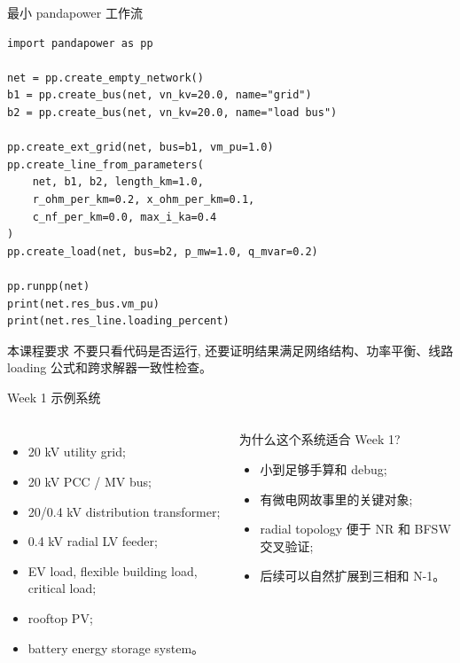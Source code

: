 \documentclass[aspectratio=169,10pt]{ctexbeamer}
\begin{document}
\begin{frame}[fragile]{最小 pandapower 工作流}
\begin{lstlisting}
import pandapower as pp

net = pp.create_empty_network()
b1 = pp.create_bus(net, vn_kv=20.0, name="grid")
b2 = pp.create_bus(net, vn_kv=20.0, name="load bus")

pp.create_ext_grid(net, bus=b1, vm_pu=1.0)
pp.create_line_from_parameters(
    net, b1, b2, length_km=1.0,
    r_ohm_per_km=0.2, x_ohm_per_km=0.1,
    c_nf_per_km=0.0, max_i_ka=0.4
)
pp.create_load(net, bus=b2, p_mw=1.0, q_mvar=0.2)

pp.runpp(net)
print(net.res_bus.vm_pu)
print(net.res_line.loading_percent)
\end{lstlisting}
\begin{alertblock}{本课程要求}
不要只看代码是否运行, 还要证明结果满足网络结构、功率平衡、线路 loading 公式和跨求解器一致性检查。
\end{alertblock}
\end{frame}

\begin{frame}{Week 1 示例系统}
\begin{columns}[T]
\begin{itemize}
  \item 20 kV utility grid;
  \item 20 kV PCC / MV bus;
  \item 20/0.4 kV distribution transformer;
  \item 0.4 kV radial LV feeder;
  \item EV load, flexible building load, critical load;
  \item rooftop PV;
  \item battery energy storage system。
\end{itemize}
\begin{block}{为什么这个系统适合 Week 1?}
\begin{itemize}
  \item 小到足够手算和 debug;
  \item 有微电网故事里的关键对象;
  \item radial topology 便于 NR 和 BFSW 交叉验证;
  \item 后续可以自然扩展到三相和 N-1。
\end{itemize}
\end{block}
\end{columns}
\end{frame}
\end{document}
